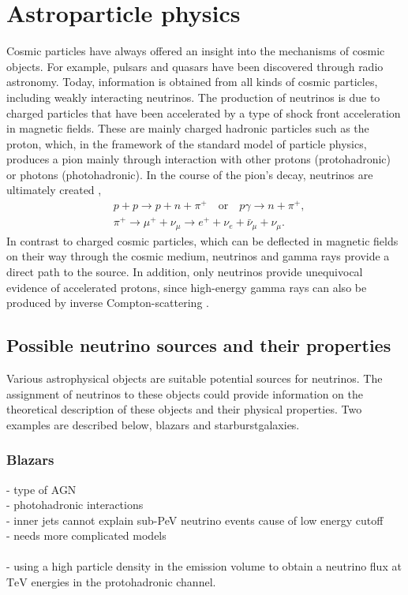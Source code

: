 \chapter{Astroparticle physics} \label{sec:astro}

Cosmic particles have always offered an insight into the mechanisms of cosmic objects.
For example, pulsars and quasars have been discovered through radio astronomy.
Today, information is obtained from all kinds of cosmic particles, including weakly interacting neutrinos.
The production of neutrinos is due to charged particles that have been accelerated by a type of shock front acceleration in magnetic fields.
These are mainly charged hadronic particles such as the proton, which, in the framework of the standard model of particle physics, produces a pion mainly through interaction with other protons (protohadronic) or photons (photohadronic).
In the course of the pion's decay, neutrinos are ultimately created \cite{pdg},
\begin{align}
  &p+p \rightarrow p+n+\pi^+ \quad \text{or} \quad p\gamma \rightarrow n+\pi^+,\\
  &\pi^+ \rightarrow \mu^++\nu_\mu \rightarrow e^++\nu_e+\bar{\nu}_\mu+\nu_\mu.
\end{align}
In contrast to charged cosmic particles, which can be deflected in magnetic fields on their way through the cosmic medium, neutrinos and gamma rays provide a direct path to the source.
In addition, only neutrinos provide unequivocal evidence of accelerated protons, since high-energy gamma rays can also be produced by inverse Compton-scattering \cite{spiering}.


\section{Possible neutrino sources and their properties}

Various astrophysical objects are suitable potential sources for neutrinos.
The assignment of neutrinos to these objects could provide information on the theoretical description of these objects and their physical properties.
Two examples are described below, blazars and starburstgalaxies.

\subsection{Blazars}
- type of AGN \\
- photohadronic interactions \\
- inner jets cannot explain sub-PeV neutrino events cause of low energy cutoff \\
- needs more complicated models \\
\cite{blazar}\\
- using a high particle density in the emission volume to obtain a neutrino flux at $\si{\tera\electronvolt}$ energies in the protohadronic channel.\\
\cite{eichmann}

